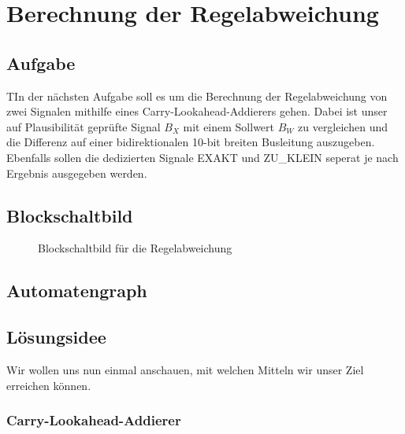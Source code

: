 \documentclass{report}
\begin{document}
\renewcommand{\thechapter}{B}

\chapter{Berechnung der Regelabweichung}
\label{cha:berechn-der-regel}
\newpage
\section{Aufgabe}
\label{sec:einleitung-1}

\begin{task}
  TIn der nächsten Aufgabe soll es um die Berechnung der Regelabweichung von zwei Signalen mithilfe eines Carry-Lookahead-Addierers gehen. Dabei ist unser auf Plausibilität geprüfte Signal $B_X$ mit einem Sollwert $B_{W}$ zu vergleichen und die Differenz auf einer bidirektionalen 10-bit breiten Busleitung auszugeben. Ebenfalls sollen die dedizierten Signale EXAKT und ZU\_KLEIN seperat je nach Ergebnis ausgegeben werden.

\end{task}


\section{Blockschaltbild}
\label{sec:blockschaltbild-1}

\begin{figure}[h]
  \centering
  \caption{Blockschaltbild für die Regelabweichung}
  \label{fig:blockregel}
\end{figure}



\section{Automatengraph}
\label{sec:automatengraph}


\section{Lösungsidee}
\label{sec:losungsidee-1}

Wir wollen uns nun einmal anschauen, mit welchen Mitteln wir unser Ziel erreichen können.

\subsection{Carry-Lookahead-Addierer}
\label{sec:carry-look-addi}
\end{document}
